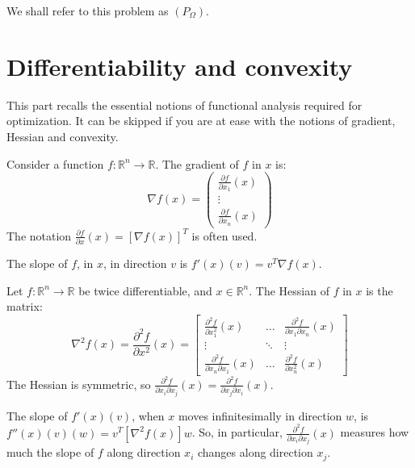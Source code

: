 \documentclass{article}
\begin{document}
\noindent We shall refer to this problem as $\left(P_\Omega\right)$.

\section{Differentiability and convexity}

This part recalls the essential notions of functional analysis required for optimization. It can be skipped if you are at ease with the notions of gradient, Hessian and convexity.

\noindent Consider a function $f:\mathbb{R}^n\rightarrow \mathbb{R}$. The gradient of $f$ in $x$ is:
\begin{equation*}
\nabla f(x) = \left( \begin{array}{c}
\frac{\partial f}{\partial x_1}(x)\\
\vdots\\
\frac{\partial f}{\partial x_n}(x)
\end{array} \right)
\end{equation*}
The notation $\frac{\partial f}{\partial x}(x) = \left[\nabla f(x)\right]^T$ is often used.

\noindent The slope of $f$, in $x$, in direction $v$ is $f'(x)(v) = v^T \nabla f(x)$.

\noindent Let $f:\mathbb{R}^n\rightarrow\mathbb{R}$ be twice differentiable, and $x\in\mathbb{R}^n$. The Hessian of $f$ in $x$ is the matrix:
\begin{equation*}
\nabla^2 f(x) = \frac{\partial^2 f}{\partial x^2}(x) = \left[\begin{array}{ccc}
\frac{\partial^2 f}{\partial x_1^2}(x) & 
\ldots & \frac{\partial^2 f}{\partial x_1\partial x_n}(x) \\
\vdots & \ddots & \vdots \\
\frac{\partial^2 f}{\partial x_n \partial x_1}(x) & \ldots &
\frac{\partial^2 f}{\partial x_n^2}(x) \end{array}\right]
\end{equation*}
\noindent The Hessian is symmetric, so  $\frac{\partial^2 f}{\partial x_i\partial x_j}(x) = \frac{\partial^2 f}{\partial x_j\partial x_i}(x)$.

\noindent The slope of $f'(x)(v)$, when $x$ moves infinitesimally in direction $w$, is $f''(x)(v)(w) = v^T \left[\nabla^2 f(x)\right] w$. So, in particular, $\frac{\partial^2 f}{\partial x_i\partial x_j}(x)$ measures how much the slope of $f$ along direction $x_i$ changes along direction $x_j$.
\end{document}

